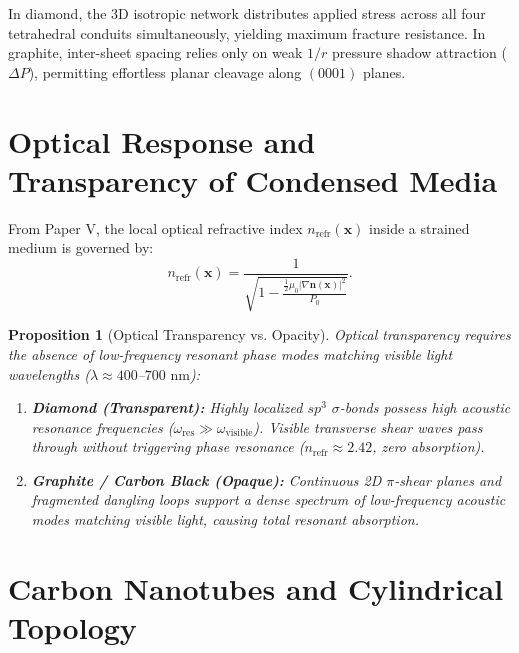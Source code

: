 \documentclass[11pt,a4paper]{article}
\newtheorem{prop}{Proposition}
\begin{document}
	In diamond, the 3D isotropic network distributes applied stress across all four tetrahedral conduits simultaneously, yielding maximum fracture resistance. In graphite, inter-sheet spacing relies only on weak $1/r$ pressure shadow attraction ($\Delta P$), permitting effortless planar cleavage along $(0001)$ planes.
	
	\section{Optical Response and Transparency of Condensed Media}
	\label{sec:optical_response}
	
	From Paper V, the local optical refractive index $n_{\text{refr}}(\mathbf{x})$ inside a strained medium is governed by:
	\begin{equation}
		n_{\text{refr}}(\mathbf{x}) = \frac{1}{\sqrt{1 - \frac{\frac{1}{2}\mu_0 |\nabla \mathbf{n}(\mathbf{x})|^2}{P_0}}}.
		\label{eq:refractive_index_condensed}
	\end{equation}
	
	\begin{prop}[Optical Transparency vs. Opacity]
		\label{prop:transparency_mechanics}
		Optical transparency requires the absence of low-frequency resonant phase modes matching visible light wavelengths ($\lambda \approx 400$--$700 \text{ nm}$):
		\begin{enumerate}
			\item \textbf{Diamond (Transparent):} Highly localized $sp^3$ $\sigma$-bonds possess high acoustic resonance frequencies ($\omega_{\text{res}} \gg \omega_{\text{visible}}$). Visible transverse shear waves pass through without triggering phase resonance ($n_{\text{refr}} \approx 2.42$, zero absorption).
			\item \textbf{Graphite / Carbon Black (Opaque):} Continuous 2D $\pi$-shear planes and fragmented dangling loops support a dense spectrum of low-frequency acoustic modes matching visible light, causing total resonant absorption.
		\end{enumerate}
	\end{prop}
	
	\section{Carbon Nanotubes and Cylindrical Topology}
	\label{sec:nanotubes_topology}
	
\end{document}
